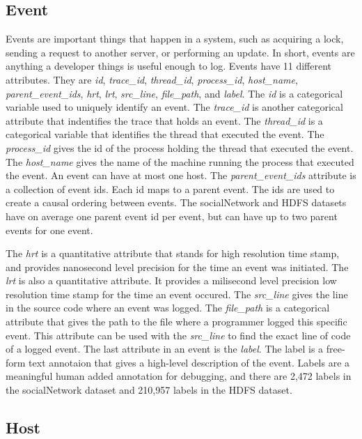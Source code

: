 \subsection{Event}

Events are important things that happen in a system, such as acquiring a lock, sending a request to another server,
or performing an update. In short, events are anything a developer things is useful enough to log. Events have 11
different attributes. They are \textit{id}, \textit{trace\_id}, \textit{thread\_id}, \textit{process\_id}, \textit{host\_name},
\textit{parent\_event\_ids}, \textit{hrt}, \textit{lrt}, \textit{src\_line}, \textit{file\_path}, and \textit{label}. The
\textit{id} is a categorical variable used to uniquely identify an event. The \textit{trace\_id} is another categorical
attribute that indentifies the trace that holds an event. The \textit{thread\_id} is a categorical variable that identifies the
thread that executed the event. The \textit{process\_id} gives the id of the process holding the thread that executed the event.
The \textit{host\_name} gives the name of the machine running the process that executed the event. An event can have at most one
host. The \textit{parent\_event\_ids} attribute is a collection of event ids. Each id maps to a parent event. The ids are used to
create a causal ordering between events. The socialNetwork and HDFS datasets have on average one parent event id per event, but 
can have up to two parent events for one event. 

The \textit{hrt} is a quantitative attribute that stands for high resolution time
stamp, and provides nanosecond level precision for the time an event was initiated. The \textit{lrt} is also a quantitative attribute.
It provides a milisecond level precision low resolution time stamp for the time an event occured. The \textit{src\_line} gives the line
in the source code where an event was logged. The \textit{file\_path} is a categorical attribute that gives the path to the file where 
a programmer logged this specific event. This attribute can be used with the \textit{src\_line} to find the exact line of code of a logged event.
The last attribute in an event is the \textit{label}. The label is a free-form text annotaion that gives a high-level description of the
event. Labels are a meaningful human added annotation for debugging, and there are 2,472 labels in the socialNetwork dataset and 210,957 labels
in the HDFS dataset.

\subsection{Host}

